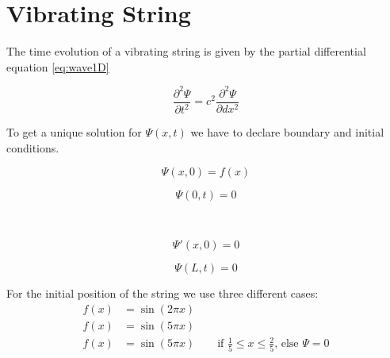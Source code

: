 \documentclass[a4paper]{article}
\begin{document}
\section{Vibrating String}
The time evolution of a vibrating string is given by the partial differential equation \ref{eq:wave1D}

\begin{equation}
\frac{\partial ^2 \Psi}{\partial  t^2} = c^2 \frac{\partial ^2 \Psi}{\partial dx^2} 
\label{eq:wave1D}
\end{equation}

To get a unique solution for $\Psi (x,t)$ we have to declare boundary and initial conditions.


\noindent\begin{minipage}{.5\linewidth}
\begin{equation*}
\Psi (x, 0) = f(x)
\end{equation*}
\end{minipage}
\begin{minipage}{.5\linewidth}
\begin{equation*}
\Psi (0, t) = 0
\end{equation*}
\end{minipage}\\
\begin{minipage}{.5\linewidth}
\begin{equation*}
\Psi '(x,0) = 0
\end{equation*}
\end{minipage}
\begin{minipage}{.5\linewidth}
\begin{equation*}
\Psi (L,t) = 0
\end{equation*}
\end{minipage}
\label{eq:wave1Dinit}

For the initial position of the string we use three different cases:
\begin{subequations}
\begin{align}
f(x) &= \sin (2 \pi x)\\  
\label{eq:init2} f(x) &= \sin (5 \pi x)\\
f(x) &= \sin (5 \pi x) \qquad \text{if } \frac{1}{5} \le x \le \frac{2}{5} \text{, else } \Psi = 0
\end{align}
\end{subequations}
\end{document}
